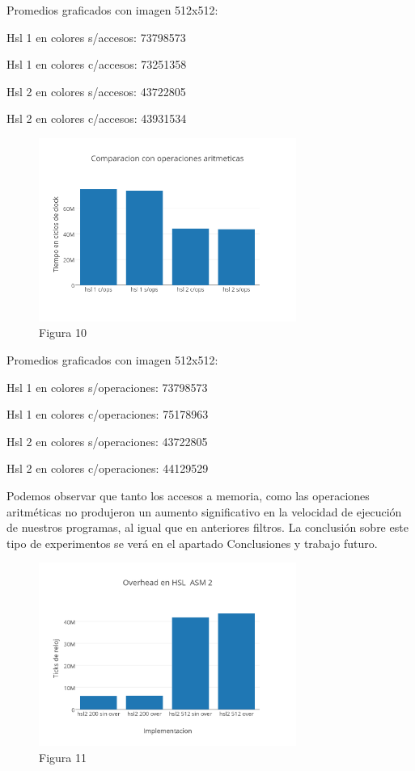 \documentclass[a4paper]{article}
\begin{document}
Promedios graficados con imagen 512x512:

Hsl 1 en colores s/accesos: 73798573

Hsl 1 en colores c/accesos: 73251358

Hsl 2 en colores s/accesos: 43722805

Hsl 2 en colores c/accesos: 43931534



\begin{figure}[h]
  \centering
    \includegraphics[width=0.75\textwidth]{imagenes/ComparacionConOperacionesAritmeticasHslColores.png}
  \caption{Figura 10}
  \label{fig:graficohsl4}
\end{figure}
 \FloatBarrier

Promedios graficados con imagen 512x512:

Hsl 1 en colores s/operaciones: 73798573

Hsl 1 en colores c/operaciones: 75178963

Hsl 2 en colores s/operaciones: 43722805

Hsl 2 en colores c/operaciones: 44129529

Podemos observar que tanto los accesos a memoria, como las operaciones aritméticas no produjeron un aumento significativo en la velocidad de ejecución de nuestros programas, al igual que en anteriores filtros. La conclusión sobre este tipo de experimentos se verá en el apartado Conclusiones y trabajo futuro.

\begin{figure}[h]
  \centering
    \includegraphics[width=0.75\textwidth]{imagenes/OverheadEnHSLASM2.png}
  \caption{Figura 11}
  \label{fig:graficohsl5}
\end{figure}
 \FloatBarrier
\end{document}
